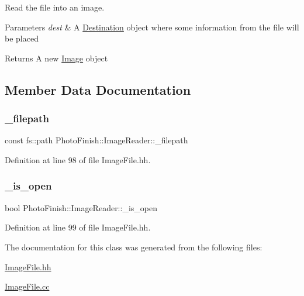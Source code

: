 Read the file into an image. 


\begin{DoxyParams}{Parameters}
{\em dest} & A \hyperlink{class_photo_finish_1_1_destination}{Destination} object where some information from the file will be placed \\
\hline
\end{DoxyParams}
\begin{DoxyReturn}{Returns}
A new \hyperlink{class_photo_finish_1_1_image}{Image} object 
\end{DoxyReturn}


\subsection{Member Data Documentation}
\mbox{\label{class_photo_finish_1_1_image_reader_a674ef814523d0ff26c92c725888df0fa}} 
\subsubsection{\texorpdfstring{\+\_\+filepath}{\_filepath}}
{\footnotesize\ttfamily const fs\+::path Photo\+Finish\+::\+Image\+Reader\+::\+\_\+filepath\hspace{0.3cm}{\ttfamily [protected]}}



Definition at line 98 of file Image\+File.\+hh.

\mbox{\label{class_photo_finish_1_1_image_reader_a969fccd8f1d2fb28875c62a3f051dbcb}} 
\subsubsection{\texorpdfstring{\+\_\+is\+\_\+open}{\_is\_open}}
{\footnotesize\ttfamily bool Photo\+Finish\+::\+Image\+Reader\+::\+\_\+is\+\_\+open\hspace{0.3cm}{\ttfamily [protected]}}



Definition at line 99 of file Image\+File.\+hh.



The documentation for this class was generated from the following files\+:\begin{DoxyCompactItemize}
\item 
\hyperlink{_image_file_8hh}{Image\+File.\+hh}\item 
\hyperlink{_image_file_8cc}{Image\+File.\+cc}\end{DoxyCompactItemize}
